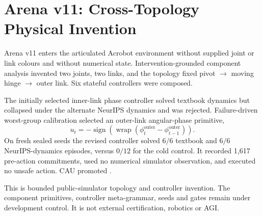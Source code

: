 \section{Arena v11: Cross-Topology Physical Invention}
\label{sec:arena-v11-cross-topology}

Arena v11 enters the articulated Acrobot environment without supplied joint or
link colours and without numerical state. Intervention-grounded component
analysis invented two joints, two links, and the topology fixed pivot $\to$
moving hinge $\to$ outer link. Six stateful controllers were composed.

The initially selected inner-link phase controller solved textbook dynamics but
collapsed under the alternate NeurIPS dynamics and was rejected. Failure-driven
worst-group calibration selected an outer-link angular-phase primitive,
\begin{equation}
 u_t=-\operatorname{sign}\!\left(
 \operatorname{wrap}(\phi^{\mathrm{outer}}_t-
 \phi^{\mathrm{outer}}_{t-1})\right).
\end{equation}
On fresh sealed seeds the revised controller solved $6/6$ textbook and $6/6$
NeurIPS-dynamics episodes, versus $0/12$ for the cold control. It recorded 1,617
pre-action commitments, used no numerical simulator observation, and executed
no unsafe action. CAU promoted
.

This is bounded public-simulator topology and controller invention.  The
component primitives, controller meta-grammar, seeds and gates remain under
development control.  It is not external certification, robotics or AGI.
